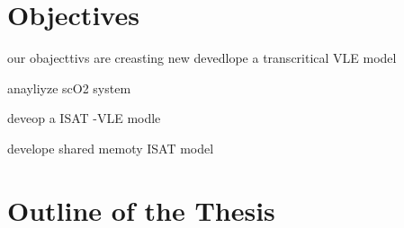 
\section{Objectives}

our obajecttivs are creasting new devedlope a transcritical VLE model 

anayliyze scO2 system 

deveop a ISAT -VLE modle 

develope shared memoty ISAT model


\section{Outline of the Thesis}





